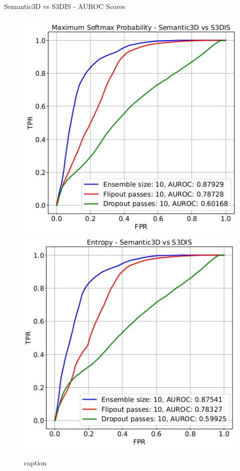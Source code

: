 \documentclass[aspectratio=169]{beamer}
\begin{document}
\begin{frame}{Semantic3D vs S3DIS - AUROC Scores}
    \begin{figure}
        \includegraphics[scale = 0.35]{images/ood1_msp_roc.jpg}
        \includegraphics[scale=0.35]{images/ood1_ent_roc.jpg}
        \caption{caption}
    \end{figure}
\end{frame}
\end{document}
